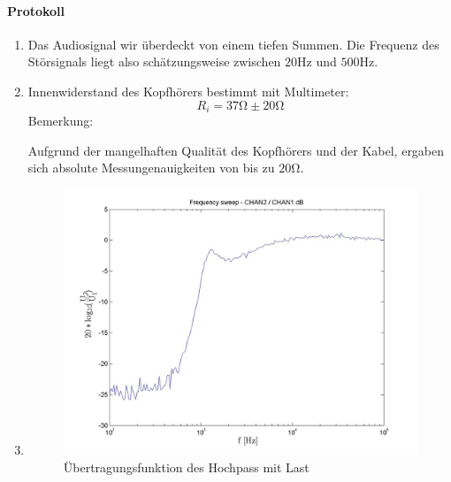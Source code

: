 \documentclass[10pt]{scrreprt}
\begin{document}
    \paragraph{Protokoll}
    \begin{enumerate}
        \item Das Audiosignal wir überdeckt von einem tiefen Summen. Die Frequenz
        des Störsignals liegt also schätzungsweise zwischen $20\si{\hertz}$ und
        $500\si{\hertz}$.
        \item
            Innenwiderstand des Kopfhörers bestimmt mit Multimeter:
            \begin{equation*}
                R_i = 37\si{\ohm} \pm 20\si{\ohm}
            \end{equation*}
            Bemerkung:

            Aufgrund der mangelhaften Qualität des Kopfhörers und der Kabel, ergaben
            sich absolute Messungenauigkeiten von bis zu $20\si{\ohm}$.
        \item
            \begin{center}
                \begin{figure}[H]
                    \includegraphics[width=\textwidth]{FS_55M_frequencysweep_ylogxlog.jpg}
                    \caption{Übertragungsfunktion des Hochpass mit Last}
                    \label{fig:abbM}
                \end{figure}
            \end{center}
            \begin{center}
                \begin{figure}[H]

\end{figure}
\end{center}
\end{enumerate}
\end{document}
